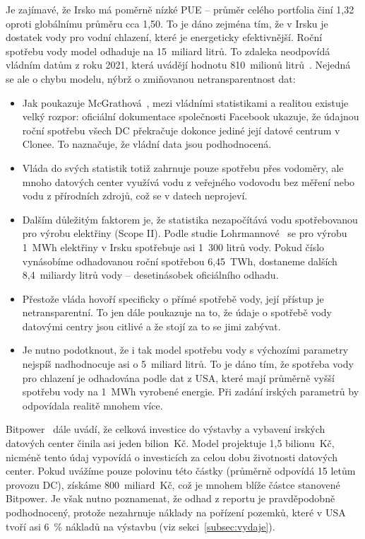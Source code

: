 Je zajímavé, že Irsko má poměrně nízké PUE -- průměr celého portfolia činí 1,32 oproti globálnímu průměru cca 1,50. To je dáno zejména tím, že v Irsku je dostatek vody pro vodní chlazení, které je energeticky efektivnější. Roční spotřebu vody model odhaduje na 15~miliard litrů. To zdaleka neodpovídá vládním datům z roku 2021, která uvádějí hodnotu 810~milionů litrů~\cite{testing_water_ireland_2022}. Nejedná se ale o chybu modelu, nýbrž o zmiňovanou netransparentnost dat:

\begin{itemize}

    \item Jak poukazuje McGrathová~\cite{testing_mcgarth_2024}, mezi vládními statistikami a realitou existuje velký rozpor: oficiální dokumentace společnosti Facebook ukazuje, že údajnou roční spotřebu všech DC překračuje dokonce jediné její datové centrum v Clonee. To naznačuje, že vládní data jsou podhodnocená.
    
    \item Vláda do svých statistik totiž zahrnuje pouze spotřebu přes vodoměry, ale mnoho datových center využívá vodu z veřejného vodovodu bez měření nebo vodu z přírodních zdrojů, což se v datech neprojeví.

    \item Dalším důležitým faktorem je, že statistika nezapočítává vodu spotřebovanou pro výrobu elektřiny (Scope II). Podle studie Lohrmannové~\cite{lohrmann_assessment_2021} se pro výrobu 1~MWh elektřiny v Irsku spotřebuje asi 1~300 litrů vody. Pokud číslo vynásobíme odhadovanou roční spotřebou 6,45~TWh, dostaneme dalších 8,4~miliardy litrů vody -- desetinásobek oficiálního odhadu.

    \item Přestože vláda hovoří specificky o přímé spotřebě vody, její přístup je netransparentní. To jen dále poukazuje na to, že údaje o spotřebě vody datovými centry jsou citlivé a že stojí za to se jimi zabývat.

    \item Je nutno podotknout, že i tak model spotřebu vody s výchozími parametry nejspíš nadhodnocuje asi o 5~miliard litrů. To je dáno tím, že spotřeba vody pro chlazení je odhadována podle dat z USA, které mají průměrně vyšší spotřebu vody na 1~MWh vyrobené energie. Při zadání irských parametrů by odpovídala realitě mnohem více.

\end{itemize}

Bitpower~\cite{testing_bitpower_2024} dále uvádí, že celková investice do výstavby a vybavení irských datových center činila asi jeden bilion~Kč. Model projektuje 1,5 bilionu~Kč, nicméně tento údaj vypovídá o investicích za celou dobu životnosti datových center. Pokud uvážíme pouze polovinu této částky (průměrně odpovídá 15 letům provozu DC), získáme 800~miliard~Kč, což je mnohem blíže částce stanovené Bitpower. Je však nutno poznamenat, že odhad z reportu je pravděpodobně podhodnocený, protože nezahrnuje náklady na pořízení pozemků, které v USA tvoří asi 6~\% nákladů na výstavbu (viz sekci~\ref{subsec:vydaje}).

